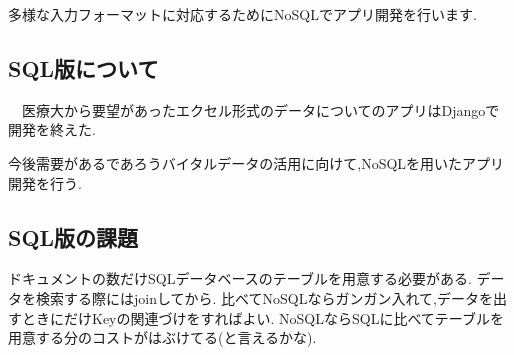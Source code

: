 多様な入力フォーマットに対応するためにNoSQLでアプリ開発を行います.
\subsection{SQL版について}
　医療大から要望があったエクセル形式のデータについてのアプリはDjangoで開発を終えた.

  今後需要があるであろうバイタルデータの活用に向けて,NoSQLを用いたアプリ開発を行う.
\subsection{SQL版の課題}
  ドキュメントの数だけSQLデータベースのテーブルを用意する必要がある.
  データを検索する際にはjoinしてから.
  比べてNoSQLならガンガン入れて,データを出すときにだけKeyの関連づけをすればよい.
  NoSQLならSQLに比べてテーブルを用意する分のコストがはぶけてる(と言えるかな).
